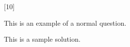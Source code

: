 [10]

This is an example of a normal question.

\begin{solution}
  This is a sample solution.
\end{solution}
